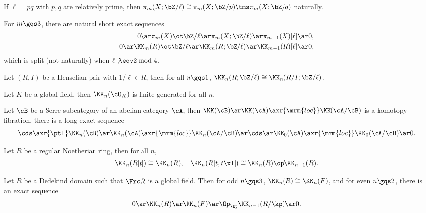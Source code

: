 \documentclass[article, a4paper, twoside]{universal}
\begin{document}
\begin{thm}
    If $\ell=pq$ with $p,q$ are relatively prime, then $\pi_{m}(X;\bZ/\ell)\cong\pi_{m}(X;\bZ/p)\tms\pi_{m}(X;\bZ/q)$ naturally.
\end{thm}

\begin{thm}
    For $m\gqs3$, there are natural short exact sequences
    \begin{align*}
        0\ar\pi_{m}(X)\ot\bZ/\ell\ar\pi_{m}(X;\bZ/\ell)\ar\pi_{m-1}(X)[\ell]\ar0,\\
        0\ar\KK_{m}(R)\ot\bZ/\ell\ar\KK_{m}(R;\bZ/\ell)\ar\KK_{m-1}(R)[\ell]\ar 0,
    \end{align*}
    which is split (not naturally) when $\ell\not\eqv 2\bmod{4}$.
\end{thm}

\begin{thm}
    Let $(R,I)$ be a Henselian pair with $1/\ell\in R$, then for all $n\gqs1$, $\KK_{n}(R;\bZ/\ell)\cong \KK_{n}(R/I;\bZ/\ell)$.
\end{thm}

\begin{cnj}
    Let $K$ be a global field, then $\KK_{n}(\cO_{K})$ is finite generated for all $n$.
\end{cnj}

\begin{thm}
    Let $\cB$ be a Serre subcategory of an abelian category $\cA$, then $\KK(\cB)\ar \KK(\cA)\axr{\mrm{loc}}\KK(\cA/\cB)$ is a homotopy fibration, there is a long exact sequence
    \[
        \cds\axr{\ptl}\KK_{n}(\cB)\ar\KK_{n}(\cA)\axr{\mrm{loc}}\KK_{n}(\cA/\cB)\ar\cds\ar\KK_{0}(\cA)\axr{\mrm{loc}} \KK_{0}(\cA/\cB)\ar0.
    \]
\end{thm}

\begin{thm}[\Rnum{5}.6.3]
    Let $R$ be a regular Noetherian ring, then for all $n$,
    \[
        \KK_{n}(R[t])\cong\KK_{n}(R),\quad \KK_{n}(R[t,t\xI])\cong \KK_{n}(R)\op \KK_{n-1}(R).
    \]
\end{thm}


\begin{thm}[\Rnum{5}.6.8]
    Let $R$ be a Dedekind domain such that $\Frc R$ is a global field. Then for odd $n\gqs3$, $\KK_{n}(R)\cong \KK_{n}(F)$, and for even $n\gqs2$, there is an exact sequence
    \[
        0\ar \KK_{n}(R)\ar \KK_{n}(F)\ar \Op_{\kp}\KK_{n-1}(R/\kp)\ar 0.
    \]
\end{thm}
\end{document}

